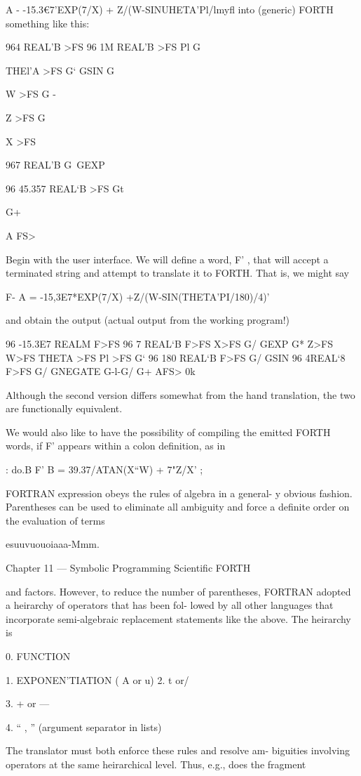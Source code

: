 A - -15.3€7'EXP(7/X) + Z/(W-SINUHETA'Pl/lmyﬂ
into (generic) FORTH something like this:

964 REAL’B >FS
96 1M REAL'B >FS
Pl G\

THEl’A >FS G‘
GSIN G

W >FS G -

Z >FS G\

X >FS

967 REAL'B G\
GEXP

96 45.357 REAL‘B >FS
Gt

G+

A FS>

Begin with the user interface. We will define a word, F' , that
will accept a terminated string and attempt to translate it to
FORTH. That is, we might say

F- A = -15,3E7*EXP(7/X) +Z/(W-SIN(THETA'PI/180)/4)'

and obtain the output (actual output from the working program!)

96 -15.3E7 REALM F>FS 96 7 REAL‘B F>FS
X>FS G/ GEXP G* Z>FS W>FS
THETA >FS Pl >FS G‘ 96 180 REAL‘B F>FS
G/ GSIN 96 4REAL‘8 F>FS G/ GNEGATE
G-l-G/ G+ AFS> 0k

Although the second version differs somewhat from the hand
translation, the two are functionally equivalent.

We would also like to have the possibility of compiling the emitted
FORTH words, if F' appears within a colon definition, as in

: do.B F' B = 39.37/ATAN(X“W) + 7"Z/X' ;

FORTRAN expression obeys the rules of algebra in a general-
y obvious fashion. Parentheses can be used to eliminate all
ambiguity and force a definite order on the evaluation of terms

esuuvuouoiaaa-Mmm.

Chapter 11 — Symbolic Programming Scientific FORTH

and factors. However, to reduce the number of parentheses,
FORTRAN adopted a heirarchy of operators that has been fol-
lowed by all other languages that incorporate semi-algebraic
replacement statements like the above. The heirarchy is

0. FUNCTION

1. EXPONEN'TIATION ( A or u)
2. t or/

3. + or —

4. “ , ” (argument separator in lists)

The translator must both enforce these rules and resolve am-
biguities involving operators at the same heirarchical level. Thus,
e.g., does the fragment

